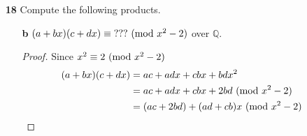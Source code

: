 \documentclass[paper=usletter, fontsize=12pt]{article}
\begin{document}
\begin{enumerate}
\begin{enumerate}
\begin{proof}
                Factoring $x^6-1$,
                \begin{align*}
                    x^6-1 & = (x^3)^2-1^2\\
                    & = (x^3-1)(x^3+1)\\
                    & = (x^3-1^3)(x^3+1^3)\\
                    & = (x^3-1^3)(x+1)(x^2-x+1)\\
                    & = (x^3-1^3)(x+1)(x^2-x+1)\\
                    & = (x-1)(x^2+x+1)(x+1)(x^2-x+1)
                \end{align*}
                Factors of degree $1$, $(x-1)$ and $(x+1)$ are irreducible\\
                Also, both factors $(x^2+x+1)$ and $(x^2-x+1)$ have no roots in $\mathbb{R}$ since their discriminant $(b^2-4ac)$ are less than zero.\\
                Therefore, all factors of $x^6-1$; $(x-1)$,$(x^2+x+1)$,$(x+1)$,
                and $(x^2-x+1)$ are irreducible over $\mathbb{R}$ \qedhere

            \end{proof}

            \item[\textbf{18}] Compute the following products.
            \begin{enumerate}

                \item[\textbf{b}] $(a+bx)(c+dx) \equiv \text{???}
                \ (\mathrm{mod}\ x^2-2)$ over $\mathbb{Q}$.
                \begin{proof}

                    Since $x^2 \equiv 2 \ (\mathrm{mod}\ x^2-2)$
                    \begin{align*}
                        (a+bx)(c+dx) & = ac+adx+cbx+bdx^2\\
                        & = ac+adx+cbx+2bd \ (\mathrm{mod}\ x^2-2)\\
                        & = (ac+2bd) + (ad+cb)x \ (\mathrm{mod}\ x^2-2) \qedhere
                    \end{align*}

                \end{proof}

            \end{enumerate}

        \end{enumerate}

    \end{enumerate}
\end{document}
